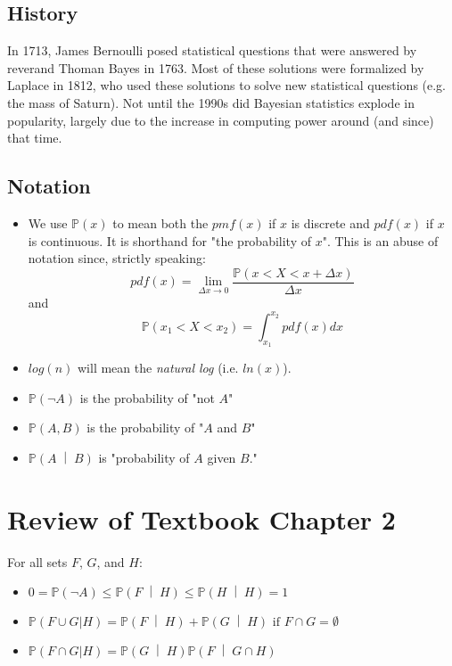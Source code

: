 \documentclass[titlepage, 12pt, leqno]{article}
\begin{document}
\subsection{History}

In 1713, James Bernoulli posed statistical questions that were answered by 
reverand Thoman Bayes in 1763. Most of these solutions were formalized by 
Laplace in 1812, who used these solutions to solve new statistical questions 
(e.g. the mass of Saturn). Not until the 1990s did Bayesian statistics explode
in popularity, largely due to the increase in computing power around (and since)
that time.

\subsection{Notation}

\begin{itemize}
    \item We use $\mathbb{P}(x)$ to mean both the $pmf(x)$ if $x$ is discrete and
        $pdf(x)$ if $x$ is continuous. It is shorthand for "the probability of 
        $x$". 
        This is an abuse of notation since, strictly speaking:
        \[
            pdf(x) = \lim_{\Delta x \to 0} 
            \frac{\mathbb{P}(x<X<x+\Delta x)}{\Delta x}
        \]
        and
        \[
            \mathbb{P}(x_1<X<x_2) = \int_{x_1}^{x_2}pdf(x)dx
        \]
    \item $log(n)$ will mean the \textit{natural log} (i.e. $ln(x)$).
    \item $\mathbb{P}(\neg A)$ is the probability of "not $A$"
    \item $\mathbb{P}(A,B)$ is the probability of "$A$ and $B$"
    \item $ \mathbb{P}\left(A \;\middle|\; B\right) $ is "probability of $A$ given
        $B$."
\end{itemize}

\pagebreak
\section{Review of Textbook Chapter 2}

For all sets $F$, $G$, and $H$:
\begin{itemize}
    \item $0 = \mathbb{P}(\neg A) \le \mathbb{P}\left(F \;\middle|\; H\right) 
        \le \mathbb{P}\left(H \;\middle|\; H\right) = 1$
    \item $\mathbb{P}(F \cup G | H) = \mathbb{P}\left(F \;\middle|\; H\right) 
        + \mathbb{P}\left(G \;\middle|\; H\right) \text{ if } F \cap G = 
        \emptyset$
    \item $\mathbb{P}(F \cap G | H) = \mathbb{P}\left(G \;\middle|\; H\right) 
        \mathbb{P}\left(F \;\middle|\; G \cap H\right) $
\end{itemize}
\end{document}
